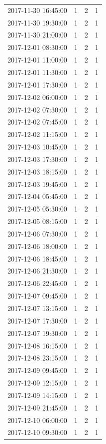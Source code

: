 \begin{tabular}{lrrr}
2017-11-30 16:45:00 & 1 & 2 & 1 \\
2017-11-30 19:30:00 & 1 & 2 & 1 \\
2017-11-30 21:00:00 & 1 & 2 & 1 \\
2017-12-01 08:30:00 & 1 & 2 & 1 \\
2017-12-01 11:00:00 & 1 & 2 & 1 \\
2017-12-01 11:30:00 & 1 & 2 & 1 \\
2017-12-01 17:30:00 & 1 & 2 & 1 \\
2017-12-02 06:00:00 & 1 & 2 & 1 \\
2017-12-02 07:30:00 & 1 & 2 & 1 \\
2017-12-02 07:45:00 & 1 & 2 & 1 \\
2017-12-02 11:15:00 & 1 & 2 & 1 \\
2017-12-03 10:45:00 & 1 & 2 & 1 \\
2017-12-03 17:30:00 & 1 & 2 & 1 \\
2017-12-03 18:15:00 & 1 & 2 & 1 \\
2017-12-03 19:45:00 & 1 & 2 & 1 \\
2017-12-04 05:45:00 & 1 & 2 & 1 \\
2017-12-05 05:30:00 & 1 & 2 & 1 \\
2017-12-05 08:15:00 & 1 & 2 & 1 \\
2017-12-06 07:30:00 & 1 & 2 & 1 \\
2017-12-06 18:00:00 & 1 & 2 & 1 \\
2017-12-06 18:45:00 & 1 & 2 & 1 \\
2017-12-06 21:30:00 & 1 & 2 & 1 \\
2017-12-06 22:45:00 & 1 & 2 & 1 \\
2017-12-07 09:45:00 & 1 & 2 & 1 \\
2017-12-07 13:15:00 & 1 & 2 & 1 \\
2017-12-07 17:30:00 & 1 & 2 & 1 \\
2017-12-07 19:30:00 & 1 & 2 & 1 \\
2017-12-08 16:15:00 & 1 & 2 & 1 \\
2017-12-08 23:15:00 & 1 & 2 & 1 \\
2017-12-09 09:45:00 & 1 & 2 & 1 \\
2017-12-09 12:15:00 & 1 & 2 & 1 \\
2017-12-09 14:15:00 & 1 & 2 & 1 \\
2017-12-09 21:45:00 & 1 & 2 & 1 \\
2017-12-10 06:00:00 & 1 & 2 & 1 \\
2017-12-10 09:30:00 & 1 & 2 & 1 \\

\end{tabular}
